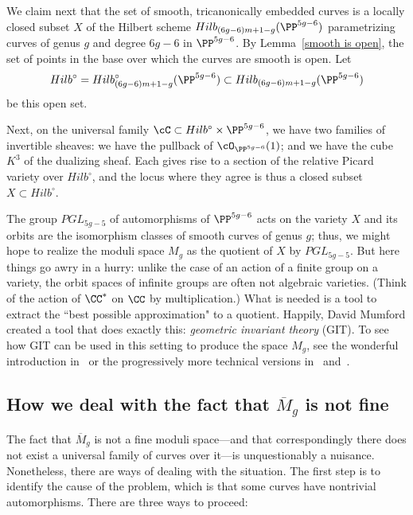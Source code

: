 We claim next that the set of smooth, tricanonically embedded curves is a locally closed subset $X$ of the Hilbert scheme $Hilb_{(6g-6)m+1-g}(\PP^{5g-6})$ parametrizing curves of genus $g$ and degree $6g-6$ in $\PP^{5g-6}$. By Lemma~\ref{smooth is open}, the set of points in the base over which the curves are smooth is open.  Let 
$$
Hilb^\circ = Hilb^\circ_{(6g-6)m+1-g}(\PP^{5g-6})\subset Hilb_{(6g-6)m+1-g}(\PP^{5g-6})
$$
be this open set.

Next, on the universal family $\cC \subset Hilb^\circ \times \PP^{5g-6}$, we have two families of invertible sheaves: we have the pullback of $\cO_{\PP^{5g-6}}(1)$; and we have the cube $K^3$ of the dualizing sheaf. Each gives rise to a section of the relative Picard variety over $Hilb^\circ$, and the locus where they agree is thus a closed subset $X \subset Hilb^\circ$.

The group $PGL_{5g-5}$ of automorphisms of $\PP^{5g-6}$ acts on the variety $X$ and its orbits
are the isomorphism classes of smooth curves of genus $g$; thus, we might hope to realize the moduli space $M_g$ as the quotient of $X$ by $PGL_{5g-5}$. But here things go awry in a hurry: unlike the case of an action of a finite group on a variety,
the orbit spaces of infinite groups are often not algebraic varieties. (Think of the action of $\CC^*$ on $\CC$ by multiplication.) What is needed is a tool to extract the ``best possible approximation" to a quotient. Happily, David Mumford created a tool that does exactly this:  \emph{geometric invariant theory} (GIT).  To see how GIT can be used in this  setting to produce the space $M_g$, see the wonderful introduction in~\cite{Mumford-Suominen} or the progressively more technical versions in~\cite{MR0450272} and~\cite{MR1631825}.

\subsection{How we deal with the fact that $\overline M_g$ is not fine}

The fact that $\overline M_g$ is not a fine moduli space---and that correspondingly there does not exist a universal family of curves over it---is unquestionably a nuisance. Nonetheless, there are ways of dealing with the situation. The first step is to identify the cause of the problem, which is that some curves have nontrivial automorphisms. There are three ways to proceed:

